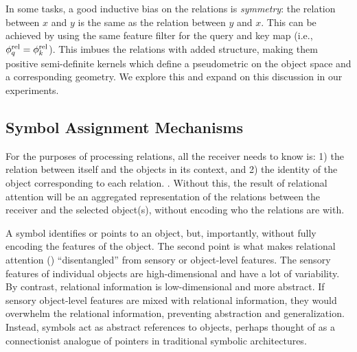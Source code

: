 In some tasks, a good inductive bias on the relations is \textit{symmetry}: the relation between $x$ and $y$ is the same as the relation between $y$ and $x$. This can be achieved by using the same feature filter for the query and key map (i.e., $\phi_q^{\mathrm{rel}} = \phi_k^{\mathrm{rel}}$). This imbues the relations with added structure, making them positive semi-definite kernels which define a pseudometric on the object space and a corresponding geometry. We explore this and expand on this discussion in our experiments.

\subsection{Symbol Assignment Mechanisms}

For the purposes of processing relations, all the receiver needs to know is: 1) the relation between itself and the objects in its context, and 2) the identity of the object corresponding to each relation. 
. Without this, the result of relational attention will be an aggregated representation of the relations between the receiver and the selected object(s), without encoding who the relations are with.

A symbol identifies or points to an object, but, importantly, without fully encoding the features of the object. The second point is what makes relational attention () ``disentangled'' from sensory or object-level features. The sensory features of individual objects are high-dimensional and have a lot of variability. By contrast, relational information is low-dimensional and more abstract. If sensory object-level features are mixed with relational information, they would overwhelm the relational information, preventing abstraction and generalization. Instead, symbols act as abstract references to objects, perhaps thought of as a connectionist analogue of pointers in traditional symbolic architectures.

